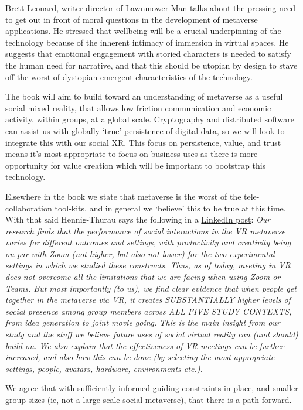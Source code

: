 Brett Leonard, writer director of Lawnmower Man talks about the pressing need to get out in front of moral questions in the development of metaverse applications. He stressed that wellbeing will be a crucial underpinning of the technology because of the inherent intimacy of immersion in virtual spaces. He suggests that emotional engagement with storied characters is needed to satisfy the human need for narrative, and that this should be utopian by design to stave off the worst of dystopian emergent characteristics of the technology.\par
The book will aim to build toward an understanding of metaverse as a useful social mixed reality, that allows low friction communication and economic activity, within groups, at a global scale. Cryptography and distributed software can assist us with globally `true' persistence of digital data, so we will look to integrate this with our social XR.  This focus on persistence, value, and trust means it's most appropriate to focus on business uses as there is more opportunity for value creation which will be important to bootstrap this technology. \par
Elsewhere in the book we state that metaverse is the worst of the tele-collaboration tool-kits, and in general we `believe' this to be true at this time. With that said Hennig-Thurau says the following in a \href{https://www.linkedin.com/feed/update/urn:li:activity:7020679507141361664/}{LinkedIn post}: \textit{Our research finds that the performance of social interactions in the VR metaverse varies for different outcomes and settings, with productivity and creativity being on par with Zoom (not higher, but also not lower) for the two experimental settings in which we studied these constructs. Thus, as of today, meeting in VR does not overcome all the limitations that we are facing when using Zoom or Teams. But most importantly (to us), we find clear evidence that when people get together in the metaverse via VR, it creates SUBSTANTIALLY higher levels of social presence among group members across ALL FIVE STUDY CONTEXTS, from idea generation to joint movie going. This is the main insight from our study and the stuff we believe future uses of social virtual reality can (and should) build on. We also explain that the effectiveness of VR meetings can be further increased, and also how this can be done (by selecting the most appropriate settings, people, avatars, hardware, environments etc.).}  \cite{hennig2022social}\par
We agree that with sufficiently informed guiding constraints in place, and smaller group sizes (ie, not a large scale social metaverse), that there is a path forward.\par
